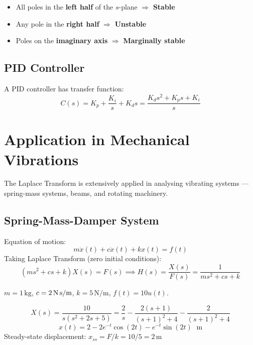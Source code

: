 \documentclass[12pt]{article}
\begin{document}
\begin{conceptbox}
\begin{itemize}[noitemsep]
  \item All poles in the \textbf{left half} of the $s$-plane $\Rightarrow$ \textbf{Stable}
  \item Any pole in the \textbf{right half} $\Rightarrow$ \textbf{Unstable}
  \item Poles on the \textbf{imaginary axis} $\Rightarrow$ \textbf{Marginally stable}
\end{itemize}
\end{conceptbox}

\subsection*{PID Controller}

A PID controller has transfer function:
\[
  C(s) = K_p + \frac{K_i}{s} + K_d s = \frac{K_d s^2 + K_p s + K_i}{s}
\]

\newpage

\section{Application in Mechanical Vibrations}

The Laplace Transform is extensively applied in analysing vibrating systems --- spring-mass systems,
beams, and rotating machinery.

\subsection*{Spring-Mass-Damper System}

Equation of motion:
\[
  m\ddot{x}(t) + c\dot{x}(t) + kx(t) = f(t)
\]
Taking Laplace Transform (zero initial conditions):
\[
  (ms^2 + cs + k)X(s) = F(s) \implies H(s) = \frac{X(s)}{F(s)} = \frac{1}{ms^2+cs+k}
\]

\begin{examplebox}
$m = 1\,\text{kg}$, $c = 2\,\text{N\,s/m}$, $k = 5\,\text{N/m}$, $f(t) = 10u(t)$.

\[
  X(s) = \frac{10}{s(s^2+2s+5)} = \frac{2}{s} - \frac{2(s+1)}{(s+1)^2+4} - \frac{2}{(s+1)^2+4}
\]
\[
  \boxed{x(t) = 2 - 2e^{-t}\cos(2t) - e^{-t}\sin(2t)\;\text{ m}}
\]
Steady-state displacement: $x_{ss} = F/k = 10/5 = 2\,\text{m}$ \checkmark
\end{examplebox}
\end{document}
